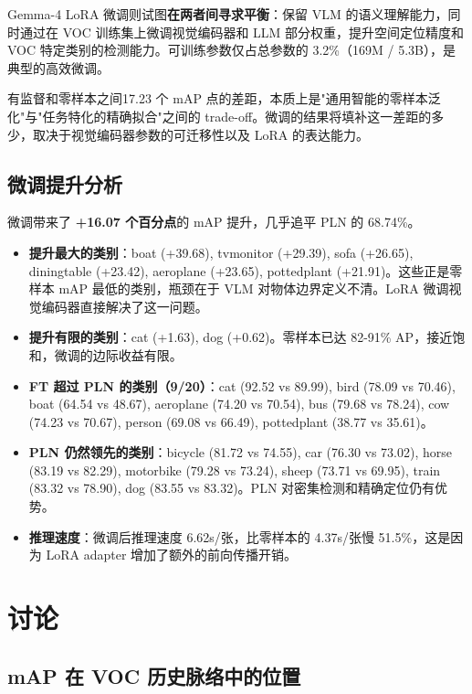 \documentclass[12pt, a4paper]{article}
\begin{document}
Gemma-4 LoRA 微调则试图\textbf{在两者间寻求平衡}：保留 VLM 的语义理解能力，同时通过在 VOC 训练集上微调视觉编码器和 LLM 部分权重，提升空间定位精度和 VOC 特定类别的检测能力。可训练参数仅占总参数的 3.2\%（169M / 5.3B），是典型的高效微调。

有监督和零样本之间17.23 个 mAP 点的差距，本质上是"通用智能的零样本泛化"与"任务特化的精确拟合"之间的 trade-off。微调的结果将填补这一差距的多少，取决于视觉编码器参数的可迁移性以及 LoRA 的表达能力。

\subsection{微调提升分析}

微调带来了 \textbf{+16.07 个百分点}的 mAP 提升，几乎追平 PLN 的 68.74\%。

\begin{itemize}
    \item \textbf{提升最大的类别}：boat (+39.68), tvmonitor (+29.39), sofa (+26.65), diningtable (+23.42), aeroplane (+23.65), pottedplant (+21.91)。这些正是零样本 mAP 最低的类别，瓶颈在于 VLM 对物体边界定义不清。LoRA 微调视觉编码器直接解决了这一问题。
    \item \textbf{提升有限的类别}：cat (+1.63), dog (+0.62)。零样本已达 82-91\% AP，接近饱和，微调的边际收益有限。
    \item \textbf{FT 超过 PLN 的类别（9/20）}：cat (92.52 vs 89.99), bird (78.09 vs 70.46), boat (64.54 vs 48.67), aeroplane (74.20 vs 70.54), bus (79.68 vs 78.24), cow (74.23 vs 70.67), person (69.08 vs 66.49), pottedplant (38.77 vs 35.61)。
    \item \textbf{PLN 仍然领先的类别}：bicycle (81.72 vs 74.55), car (76.30 vs 73.02), horse (83.19 vs 82.29), motorbike (79.28 vs 73.24), sheep (73.71 vs 69.95), train (83.32 vs 78.90), dog (83.55 vs 83.32)。PLN 对密集检测和精确定位仍有优势。
    \item \textbf{推理速度}：微调后推理速度 6.62s/张，比零样本的 4.37s/张慢 51.5\%，这是因为 LoRA adapter 增加了额外的前向传播开销。
\end{itemize}

\section{讨论}

\subsection{mAP 在 VOC 历史脉络中的位置}
\end{document}
